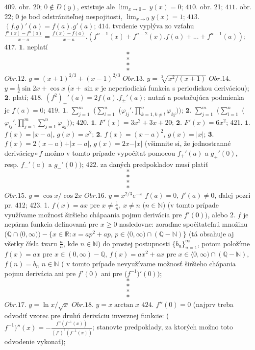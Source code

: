 $\boxed{409.}$ obr. 20; $0 \notin D(y)$, existuje ale $\lim_{x \to 0-}y(x)=0$;
$\boxed{410.}$ obr. 21; 
$\boxed{411.}$ obr. 22; 0 je bod odstrániteľnej nespojitosti,  $\lim_{x \to 0}y(x)=1$;
$\boxed{413.}$ $(f.g)'(a)=f(a).g'(a)$;
$\boxed{414.}$ tvrdenie vyplýva zo vzťahu $\frac{f^{n}(x)-f^{n}(a)}{x-a}=\frac{f(x)-f(a)}{x-a}.(f^{n-1}(x)+f^{n-2}(x).f(a)+...+f^{n-1}(a))$;
$\boxed{417.}$ $\boldsymbol{1.}$ neplatí
$$*$$
$$*$$
$$*$$
$$*$$
$\boxed{Obr.12.}$  $y=(x+1)^{2/3}+(x-1)^{2/3}$
$\boxed{Obr.13.}$  $y=\sqrt[3]{x^{2}/(x+1)}$
$\boxed{Obr.14.}$  $y=\frac{1}{2}\sin 2x +\cos x$
($x+\sin x$ je neperiodická funkcia s periodickou deriváciou);
$\boldsymbol{2.}$ platí;
$\boxed{418.}$ $(f^{2})_{\pm}'(a)=2f(a).f_{\pm}'(a)$; nutná a postačujúca podmienka je $f(a)=0 $;
$\boxed{419.}$ $\boldsymbol{1.}$  $\sum_{j=1}^m$  ($\sum_{l=1}^n$ ($\varphi _{lj}'.\prod _{k=1,k\ne l}^n \varphi _{kj}))$;
$\boldsymbol{2.}$  $\sum_{j=1}^m$  ($\sum_{l=1}^n$ ($\varphi _{lj}'.\prod _{j=1}^m \sum_{j=1}^n \varphi _{kj}))$;
$\boxed{420.}$ $\boldsymbol{1.}$ $F'(x)=3x^{2}+3x+20$;
 $\boldsymbol{2.}$ $F'(x)=6x^{2}$;
$\boxed{421.}$ $\boldsymbol{1.}$ $f(x)=\vert x-a\vert$, $g(x)=x^{2}$;
$\boldsymbol{2.}$ $f(x)=( x-a)^{2}$, $g(x)=\vert x \vert$;	
$\boldsymbol{3.}$ $f(x)=2( x-a)+\vert x-a \vert $, $g(x)=2x - \vert x \vert$ (všimnite si, že jednostranné derivácie$ g\circ f$ možno v tomto prípade vypočítať pomocou $f_{+}'(a)$ a $g_{+}'(0)$, resp. $f_{-}'(a)$ a $g_{-}'(0))$;
$\boxed{422.}$ za daných predpokladov musí platiť
$$*$$
$$*$$
$$*$$
$$*$$
$\boxed{Obr.15.}$  $y=\cos x / \cos 2x$
$\boxed{Obr.16.}$  $y=x^{2/3}e^{-x}$
$f(a)=0$, $f'(a)\ne 0$, ďalej pozri pr. 412;
$\boxed{423.}$ 1. $f(x)=ax$ pre $x\ne \frac{1}{n}$, $x\ne n$ ($n \in \mathbb{N}$) (v tomto prípade využívame možnosť širšieho chápaania pojmu derivácia pre $f'(0))$, alebo 2. $f$ je nepárna funkcia definovaná pre $x\geq 0$ nasledovne: zoraďme spočitateľnú množinu ($\mathbb{Q}\cap \langle 0, \infty)) - \lbrace x \in \mathbb{R}:x=ap^{2}+ap, \, p\in \langle 0, \infty) \cap (\mathbb{Q}- \mathbb{N}) \rbrace $ (tá obsahuje aj všetky čísla tvaru $\frac{a}{n}$, kde $n \in \mathbb{N}$) do prostej postupnosti $\lbrace b_{n} \rbrace _{n=1} ^{\infty}$, potom položíme $f(x)=ax$ pre $x \in (0,\infty) - \mathbb{Q}$, $f(x)=ax^{2}+ax$ pre $x \in \langle 0,\infty )\cap (\mathbb{Q}- \mathbb{N})$, $f(n)=b_{n}$ $ n \in \mathbb{N}$ ( v tomto prípade nevyužívame možnosť širšieho chápania pojmu derivácia ani pre $f'(0)$ ani pre ($f^{-1})'(0))$;
$$*$$
$$*$$
$$*$$
$$*$$
$\boxed{Obr.17.}$  $y=\ln x / \sqrt{x}$
$\boxed{Obr.18.}$  $y=x \arctan x$
$\boxed{424.}$ $f''(0)=0$ (najprv treba odvodiť vzorec pre druhú deriváciu inverznej funkcie: ($f^{-1})''(x)=-\frac{f''(f^{-1}(x))}{(f')^{3}(f^{-1}(x))}$; stanovte predpoklady, za ktorých možno toto odvodenie vykonať);
